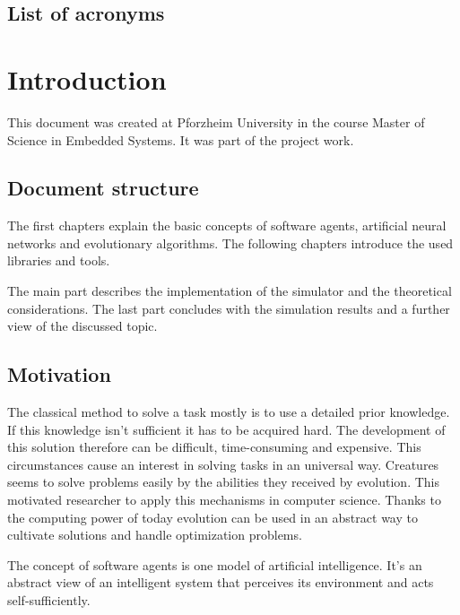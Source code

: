 \documentclass[10pt,a4paper,DIV=11]{scrreprt}
\begin{document}
\section*{List of acronyms}
\begin{acronym}[AWGN]
\end{acronym}

\chapter{Introduction}
This document was created at Pforzheim University in the course Master of Science in Embedded Systems.
It was part of the project work.

\section{Document structure}
The first chapters explain the basic concepts of software agents, artificial neural networks and evolutionary algorithms.
The following chapters introduce the used libraries and tools.

The main part describes the implementation of the simulator and the theoretical considerations. The last part concludes with the simulation results and a further view of the discussed topic.

\section{Motivation}
The classical method to solve a task mostly is to use a detailed prior knowledge. If this knowledge isn't sufficient it has to be acquired hard. The development of this solution therefore can be difficult, time-consuming and expensive.
This circumstances cause an interest in solving tasks in an universal way. Creatures seems to solve problems easily by the abilities they received by evolution. This motivated researcher to apply this mechanisms in computer science. Thanks to the computing power of today evolution can be used in an abstract way to cultivate solutions and handle optimization problems.

The concept of software agents is one model of artificial intelligence. It's an abstract view of an intelligent system that perceives its environment and acts self-sufficiently.
\end{document}
